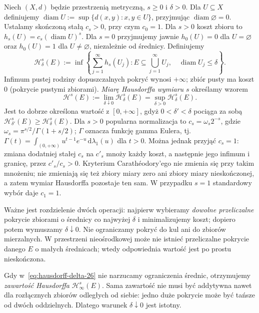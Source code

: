 \begin{definicja}
\label{def:hausdorff-measure-26}
Niech $(X,d)$ będzie przestrzenią metryczną, $s\geq0$
i $\delta>0$. Dla $U\subseteq X$ definiujemy
$\operatorname{diam}U:=\sup\{d(x,y):x,y\in U\}$,
przyjmując $\operatorname{diam}\varnothing=0$.
Ustalamy skończoną stałą $c_s>0$, przy czym $c_0=1$.
Dla $s>0$ koszt zbioru to $h_s(U)=c_s(\operatorname{diam}U)^s$.
Dla $s=0$ przyjmujemy jawnie
$h_0(U)=0$ dla $U=\varnothing$ oraz $h_0(U)=1$
dla $U\neq\varnothing$, niezależnie od średnicy.
Definiujemy
\begin{equation}\label{eq:hausdorff-delta-26}
 \mathcal H^s_\delta(E)
 :=\inf\left\{\sum_{j=1}^\infty h_s(U_j):
 E\subseteq\bigcup_{j=1}^\infty U_j,\quad
 \operatorname{diam}U_j\leq\delta\right\}.
\end{equation}
Infimum pustej rodziny dopuszczalnych pokryć wynosi
$+\infty$; zbiór pusty ma koszt $0$ (pokrycie pustymi
zbiorami). \emph{Miarę Hausdorffa wymiaru $s$} określamy
wzorem
\begin{equation}\label{eq:hausdorff-26}
 \mathcal H^s(E):=\lim_{\delta\downarrow0}
 \mathcal H^s_\delta(E)
 =\sup_{\delta>0}\mathcal H^s_\delta(E).
\end{equation}
Jest to dobrze określona wartość z $[0,+\infty]$,
gdyż $0<\delta'<\delta$ pociąga za sobą
$\mathcal H^s_{\delta'}(E)\geq\mathcal H^s_\delta(E)$.
Dla $s>0$ popularna normalizacja to
$c_s=\omega_s2^{-s}$, gdzie
$\omega_s=\pi^{s/2}/\Gamma(1+s/2)$;
$\Gamma$ oznacza funkcję gamma Eulera, tj.
$\Gamma(t)=\int_{(0,+\infty)}u^{t-1}e^{-u}\,\mathrm d\lambda_1(u)$
dla $t>0$. Można jednak przyjąć $c_s=1$: zmiana dodatniej stałej
$c_s$ na $c'_s$ mnoży każdy koszt, a następnie jego infimum
i granicę, przez $c'_s/c_s>0$. Kryterium Carathéodory'ego
nie zmienia się przy takim mnożeniu; nie zmieniają się też
zbiory miary zero ani zbiory miary nieskończonej, a zatem
wymiar Hausdorffa pozostaje ten sam.
W przypadku $s=1$ standardowy wybór daje $c_1=1$.
\end{definicja}

Ważne jest rozdzielenie dwóch operacji: najpierw
wybieramy \emph{dowolne przeliczalne} pokrycie zbiorami
o średnicy co najwyżej $\delta$ i minimalizujemy koszt;
dopiero potem wymuszamy $\delta\downarrow0$.
Nie ograniczamy pokryć do kul ani do zbiorów mierzalnych.
W przestrzeni nieośrodkowej może nie istnieć przeliczalne
pokrycie danego $E$ o małych średnicach; wtedy
odpowiednia wartość jest po prostu nieskończona.

\begin{uwaga}
Gdy w~\eqref{eq:hausdorff-delta-26} nie narzucamy
ograniczenia średnic, otrzymujemy \emph{zawartość
Hausdorffa} $\mathcal H^s_\infty(E)$. Sama zawartość
nie musi być addytywna nawet dla rozłącznych
zbiorów odległych od siebie: jedno duże pokrycie
może być tańsze od dwóch oddzielnych.
Dlatego warunek $\delta\downarrow0$ jest istotny.
\end{uwaga}

